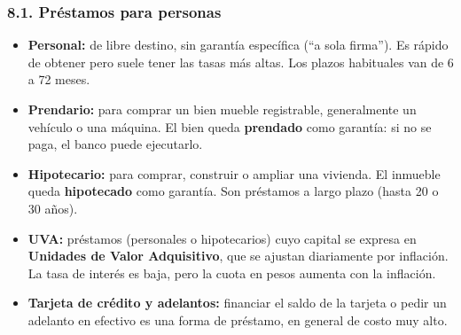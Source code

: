 \subsubsection*{8.1. Préstamos para personas}
\begin{itemize}
  \item \textbf{Personal:} de libre destino, sin garantía específica (``a sola firma''). Es
        rápido de obtener pero suele tener las tasas más altas. Los plazos habituales van
        de 6 a 72 meses.
  \item \textbf{Prendario:} para comprar un bien mueble registrable, generalmente un
        vehículo o una máquina. El bien queda \textbf{prendado} como garantía: si no se paga,
        el banco puede ejecutarlo.
  \item \textbf{Hipotecario:} para comprar, construir o ampliar una vivienda. El inmueble
        queda \textbf{hipotecado} como garantía. Son préstamos a largo plazo (hasta 20 o 30
        años).
  \item \textbf{UVA:} préstamos (personales o hipotecarios) cuyo capital se expresa en
        \textbf{Unidades de Valor Adquisitivo}, que se ajustan diariamente por inflación.
        La tasa de interés es baja, pero la cuota en pesos aumenta con la inflación.
  \item \textbf{Tarjeta de crédito y adelantos:} financiar el saldo de la tarjeta o pedir un
        adelanto en efectivo es una forma de préstamo, en general de costo muy alto.
\end{itemize}

